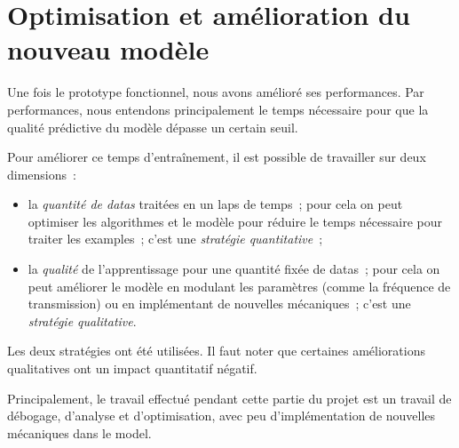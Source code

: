 \section{Optimisation et amélioration du nouveau modèle}

Une fois le prototype fonctionnel, nous avons amélioré ses performances.
Par performances, nous entendons principalement le temps nécessaire pour que la qualité prédictive du modèle dépasse un certain seuil.

Pour améliorer ce temps d'entraînement, il est possible de travailler sur deux dimensions~:
\begin{itemize}
	\item la \emph{quantité de \glspl{data}} traitées en un laps de temps~;
	pour cela on peut optimiser les algorithmes et le modèle pour réduire le temps nécessaire pour traiter les \glspl{example}~;
	c'est une \emph{stratégie quantitative}~;
	\item la \emph{qualité} de l'apprentissage pour une quantité fixée de \glspl{data}~;
	pour cela on peut améliorer le modèle en modulant les paramètres (comme la fréquence de transmission) ou en implémentant de nouvelles mécaniques~;
	c'est une \emph{stratégie qualitative}.
\end{itemize}

Les deux stratégies ont été utilisées. Il faut noter que certaines améliorations qualitatives ont un impact quantitatif négatif.

Principalement, le travail effectué pendant cette partie du projet est un travail de débogage, d'analyse et d'optimisation, avec peu d'implémentation de nouvelles mécaniques dans le \gls{model}.


